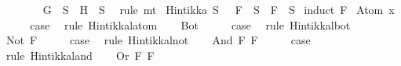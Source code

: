 \begin{isabellebody}
\ \ \ \ \isamarkupfalse%
\ {\isacartoucheopen}{\isasymnot}\ {\isacharparenleft}\isactrlbold {\isasymnot}\ G\ {\isasymin}\ S\ {\isasymor}\ H\ {\isasymin}\ S{\isacharparenright}{\isacartoucheclose}\ \isamarkupfalse%
\ {\isacharparenleft}rule\ mt{\isacharparenright}\isanewline
{}\isamarkupfalse%
%
\endisatagproof
{\isafoldproof}%
%
\isadelimproof
\isanewline
%
\endisadelimproof
\isanewline
{}\isamarkupfalse%
\ {\isachardoublequoteopen}Hintikka\ S\ {\isasymLongrightarrow}\ \isactrlbold {\isasymnot}\ F\ {\isasymin}\ S\ {\isasymlongrightarrow}\ F\ {\isasymnotin}\ S{\isachardoublequoteclose}\isanewline
%
\isadelimproof
%
\endisadelimproof
%
\isatagproof
{}\isamarkupfalse%
\ {\isacharparenleft}induct\ F{\isacharparenright}\isanewline
{}\isamarkupfalse%
\ {\isacharparenleft}Atom\ x{\isacharparenright}\isanewline
\ \ \isamarkupfalse%
\ \isamarkupfalse%
\ {\isacharquery}case\ \isamarkupfalse%
\ {\isacharparenleft}rule\ Hintikka{\isacharunderscore}l{}{}{\isacharunderscore}atom{\isacharparenright}\isanewline
{}\isamarkupfalse%
\isanewline
\ \ \isamarkupfalse%
\ Bot\isanewline
\ \ \isamarkupfalse%
\ \isamarkupfalse%
\ {\isacharquery}case\ \isamarkupfalse%
\ {\isacharparenleft}rule\ Hintikka{\isacharunderscore}l{}{}{\isacharunderscore}bot{\isacharparenright}\isanewline
{}\isamarkupfalse%
\isanewline
\ \ \isamarkupfalse%
\ {\isacharparenleft}Not\ F{\isacharparenright}\isanewline
\ \ \isamarkupfalse%
\ \isamarkupfalse%
\ {\isacharquery}case\ \isamarkupfalse%
\ {\isacharparenleft}rule\ Hintikka{\isacharunderscore}l{}{}{\isacharunderscore}not{\isacharparenright}\isanewline
{}\isamarkupfalse%
\isanewline
\ \ \isamarkupfalse%
\ {\isacharparenleft}And\ F{}\ F{}{\isacharparenright}\isanewline
\ \ \isamarkupfalse%
\ \isamarkupfalse%
\ {\isacharquery}case\ \isamarkupfalse%
\ {\isacharparenleft}rule\ Hintikka{\isacharunderscore}l{}{}{\isacharunderscore}and{\isacharparenright}\isanewline
{}\isamarkupfalse%
\isanewline
\ \ \isamarkupfalse%
\ {\isacharparenleft}Or\ F{}\ F{}{\isacharparenright}\isanewline
\ \ \isamarkupfalse%

\end{isabellebody}
